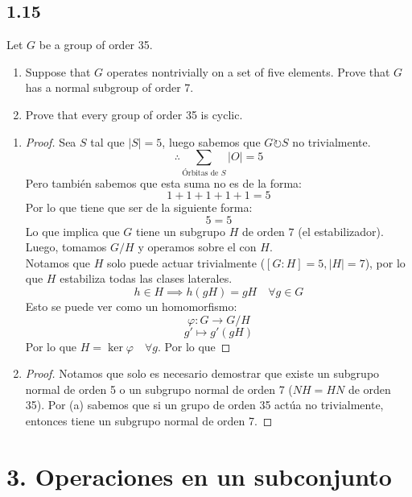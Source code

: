 \documentclass[11pt]{article}
\theoremstyle{definition}
\begin{document}
        \subsection{1.15}
        Let $G$ be a group of order 35.
        \begin{enumerate}[label=\textbf{(\alph*)}]
            \item Suppose that $G$ operates nontrivially on a set of five elements. Prove that $G$ has a normal subgroup of order 7.

            \item Prove that every group of order 35 is cyclic.
        \end{enumerate}
        \begin{enumerate}[label=\textbf{(\alph*)}]
            \item \begin{proof}
                Sea $S$ tal que $|S|=5$, luego sabemos que $G\circlearrowright S$ no trivialmente.
                \[\therefore \sum_{\textrm{Órbitas de }S}|O|=5\]
                Pero también sabemos que esta suma no es de la forma:
                \[1+1+1+1+1=5\]
                Por lo que tiene que ser de la siguiente forma:
                \[5=5\]
                Lo que implica que $G$ tiene un subgrupo $H$ de orden $7$ (el estabilizador). Luego, tomamos $G/H$ y operamos sobre el con $H$.\\
                Notamos que $H$ solo puede actuar trivialmente ($[G:H]=5,|H|=7$), por lo que $H$ estabiliza todas las clases laterales.
                \[h\in H\implies h(gH)=gH\quad\forall g\in G\]
                Esto se puede ver como un homomorfismo:
                \[\varphi:G\rightarrow G/H\]
                \[g'\mapsto g'(gH)\]
                Por lo que $H=\ker \varphi\quad\forall g$. Por lo que
            \end{proof}

            \item \begin{proof}
                Notamos que solo es necesario demostrar que existe un subgrupo normal de orden 5 o un subgrupo normal de orden 7 ($NH=HN$ de orden 35). Por (a) sabemos que si un grupo de orden 35 actúa no trivialmente, entonces tiene un subgrupo normal de orden 7.
            \end{proof}
        \end{enumerate}

        \section{3. Operaciones en un subconjunto}
\end{document}
